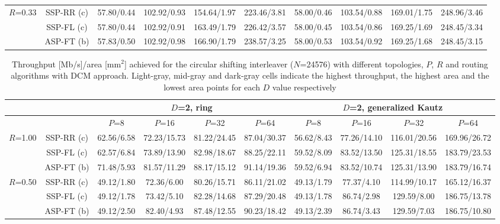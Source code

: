 \documentclass[10pt,twocolumn,journal]{IEEEtran}
\begin{document}
\begin{table*}[t!]
{\begin{tabular}{|c|c|c|c|c|c|c|c|c|c|}
\hline
\multirow{3}{*}{$R$=0.33} & SSP-RR (c) & 57.80/0.44 & 102.92/0.93 & 154.64/1.97 & 223.46/3.81 & 58.00/0.46 & 103.54/0.88 & 169.01/1.75 & 248.96/3.46 \\
& SSP-FL (c) & 57.80/0.44 & 102.92/0.91 & 163.49/1.79 & 226.42/3.57 & 58.00/0.45 & 103.54/0.86 & 169.25/1.69 & 248.45/3.34 \\
& ASP-FT (b) & 57.83/0.50 & 102.92/0.98 & 166.90/1.79 & 238.57/3.25 & 58.00/0.53 & 103.54/0.92 & 169.25/1.68 & 248.45/3.15 \\
\hline
  \end{tabular}
}
\end{table*}
\begin{table*}[t!]
  \centering
  \caption{Throughput [Mb/s]/area [mm$^2$] achieved for the circular shifting interleaver ($N$=24576) with different 
topologies, $P$, $R$ and routing algorithms with DCM approach. 
Light-gray, mid-gray and dark-gray cells indicate the highest throughput, the highest area and the lowest area points 
for each $D$ value respectively} \label{tab:mhoms_results}
   { \scriptsize
  \begin{tabular}{|c|c|c|c|c|c|c|c|c|c|}
\hline
& 	 & \multicolumn{4}{c|}{$D$=2, ring} & \multicolumn{4}{c|}{$D$=2, generalized Kautz} \\
\hline
& 	 & $P$=8 & $P$=16 & $P$=32 & $P$=64 & $P$=8 & $P$=16 & $P$=32 & $P$=64 \\
\hline
\multirow{3}{*}{$R$=1.00} & SSP-RR (c) & 62.56/6.58 & 72.23/15.73 & 81.22/24.45 & \cellcolor[gray]{0.8} 87.04/30.37 & 56.62/8.43 & 77.26/14.10 & 116.01/20.56 & \cellcolor[gray]{0.8} 169.96/26.72 \\
& SSP-FL (c) & 62.57/6.84 & 73.89/13.90 & 82.98/18.67 & 88.25/22.11 & 59.52/8.09 & 83.52/13.50 & 125.31/18.55 & 183.79/23.53 \\
& ASP-FT (b) & 71.48/5.93 & 81.57/11.29 & 88.17/15.12 & \cellcolor[gray]{0.9} 91.14/19.36 & 59.52/6.94 & 83.52/10.74 & 125.31/13.90 & 183.79/16.74 \\
\hline
\multirow{3}{*}{$R$=0.50} & SSP-RR (c) & 49.12/1.80 & 72.36/6.00 & 80.26/15.71 & 86.11/21.02 & 49.13/1.79 & 77.37/4.10 & 114.99/10.17 & 165.12/16.37 \\
& SSP-FL (c) & 49.12/1.78 & 73.42/5.10 & 82.28/14.68 & 87.29/20.48 & 49.13/1.78 & 86.74/2.98 & 129.59/8.00 & 186.75/13.78 \\
& ASP-FT (b) & 49.12/2.50 & 82.40/4.93 & 87.48/12.55 & 90.23/18.42 & 49.13/2.39 & 86.74/3.43 & 129.59/7.03 & \cellcolor[gray]{0.9} 186.75/10.80 \\
\hline

\end{tabular}}
\end{table*}
\end{document}
